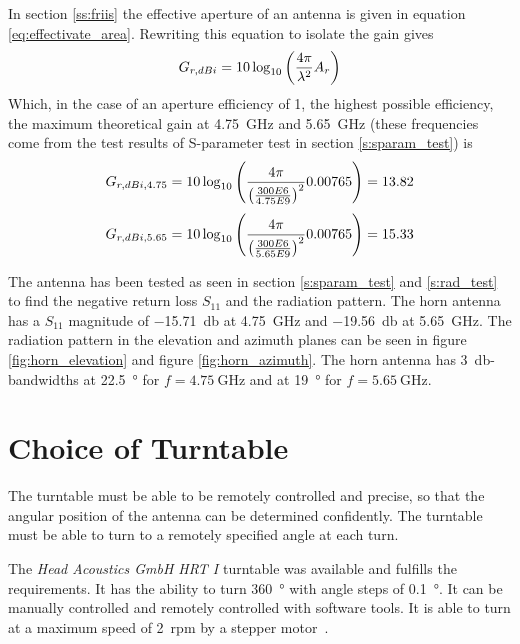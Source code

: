 In section \ref{ss:friis} the effective aperture of an antenna is given in equation \ref{eq:effectivate_area}. Rewriting this equation to isolate the gain gives
\begin{equation} \label{eq:max_gain}
    G_{r,dBi} = 10 \log_{10}\left( \frac{4 \pi}{\lambda^2} A_r \right)
    \tagaddtext{[\si{\decibel}]}
\end{equation}
Which, in the case of an aperture efficiency of 1, the highest possible efficiency, the maximum theoretical gain at \SI{4.75}{\giga\hertz} and \SI{5.65}{\giga\hertz} (these frequencies come from the test results of S-parameter test in section \ref{s:sparam_test}) is 
\begin{equation} \label{eq:max_gain_475}
    G_{r,dBi,4.75} = 10 \log_{10}\left( \frac{4 \pi}{\left(\frac{300E6}{4.75E9}\right)^2} 0.00765 \right) = 13.82
    \tagaddtext{[\si{\decibel}]}
\end{equation}
\begin{equation} \label{eq:max_gain_565}
    G_{r,dBi,5.65} = 10 \log_{10}\left( \frac{4 \pi}{\left(\frac{300E6}{5.65E9}\right)^2} 0.00765 \right) = 15.33
    \tagaddtext{[\si{\decibel}]}
\end{equation}

The antenna has been tested as seen in section \ref{s:sparam_test} and \ref{s:rad_test} to find the negative return loss $S_{11}$ and the radiation pattern. The horn antenna has a $S_{11}$ magnitude of \SI{-15.71}{\decibel} at \SI{4.75}{\giga\hertz} and \SI{-19.56}{\decibel} at \SI{5.65}{\giga\hertz}. The radiation pattern in the elevation and azimuth planes can be seen in figure \ref{fig:horn_elevation} and figure \ref{fig:horn_azimuth}. The horn antenna has \SI{3}{\decibel}-bandwidths at \SI{22.5}{\degree} for $f=\SI{4.75}{\giga\hertz}$ and at \SI{19}{\degree} for $f=\SI{5.65}{\giga\hertz}$.


\section{Choice of Turntable}
The turntable must be able to be remotely controlled and precise, so that the angular position of the antenna can be determined confidently. The turntable must be able to turn to a remotely specified angle at each turn. 

The \textit{Head Acoustics GmbH HRT I} turntable was available and fulfills the requirements. It has the ability to turn \SI{360}{\degree} with angle steps of \SI{0.1}{\degree}. It can be manually controlled and remotely controlled with software tools. It is able to turn at a maximum speed of \SI{2}{rpm} by a stepper motor~\cite{hrt_i_data_sheet}. 


